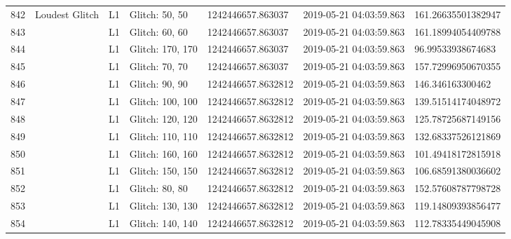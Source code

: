 \begin{longtable}{lllllll}
842  &                                     Loudest Glitch &       L1 &    Glitch: 50, 50 &   1242446657.863037 &  2019-05-21 04:03:59.863 &  161.26635501382947 \\
843  &                                                    &       L1 &    Glitch: 60, 60 &   1242446657.863037 &  2019-05-21 04:03:59.863 &  161.18994054409788 \\
844  &                                                    &       L1 &  Glitch: 170, 170 &   1242446657.863037 &  2019-05-21 04:03:59.863 &   96.99533938674683 \\
845  &                                                    &       L1 &    Glitch: 70, 70 &   1242446657.863037 &  2019-05-21 04:03:59.863 &  157.72996950670355 \\
846  &                                                    &       L1 &    Glitch: 90, 90 &  1242446657.8632812 &  2019-05-21 04:03:59.863 &    146.346163300462 \\
847  &                                                    &       L1 &  Glitch: 100, 100 &  1242446657.8632812 &  2019-05-21 04:03:59.863 &  139.51514174048972 \\
848  &                                                    &       L1 &  Glitch: 120, 120 &  1242446657.8632812 &  2019-05-21 04:03:59.863 &  125.78725687149156 \\
849  &                                                    &       L1 &  Glitch: 110, 110 &  1242446657.8632812 &  2019-05-21 04:03:59.863 &  132.68337526121869 \\
850  &                                                    &       L1 &  Glitch: 160, 160 &  1242446657.8632812 &  2019-05-21 04:03:59.863 &  101.49418172815918 \\
851  &                                                    &       L1 &  Glitch: 150, 150 &  1242446657.8632812 &  2019-05-21 04:03:59.863 &  106.68591380036602 \\
852  &                                                    &       L1 &    Glitch: 80, 80 &  1242446657.8632812 &  2019-05-21 04:03:59.863 &  152.57608787798728 \\
853  &                                                    &       L1 &  Glitch: 130, 130 &  1242446657.8632812 &  2019-05-21 04:03:59.863 &  119.14809393856477 \\
854  &                                                    &       L1 &  Glitch: 140, 140 &  1242446657.8632812 &  2019-05-21 04:03:59.863 &  112.78335449045908 \\

\end{longtable}
